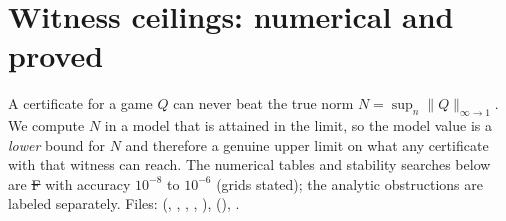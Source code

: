 \section{Witness ceilings: numerical and proved}\label{ch:ceilings}

A certificate for a game $Q$ can never beat the true norm $N=\sup_n\|Q\|_{\infty\to1}$. We compute $N$ in a model that is attained in the
limit, so the model value is a \emph{lower} bound for $N$ and therefore a genuine upper limit on what any certificate with that witness can
reach. The numerical tables and stability searches below are \st{F} with accuracy $10^{-8}$ to $10^{-6}$ (grids stated); the analytic obstructions are labeled separately. Files:  (,
, , , ),  (),
.

